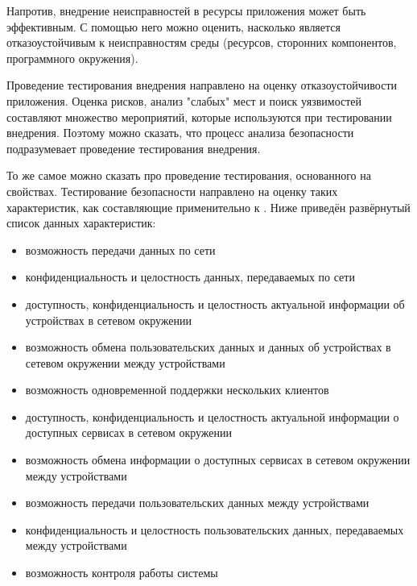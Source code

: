 %
Напротив, внедрение неисправностей в ресурсы приложения может быть эффективным. 
%
С помощью него можно оценить, насколько \PeerHood является отказоустойчивым к неисправностям среды (ресурсов, сторонних компонентов, программного окружения). 

%
Проведение тестирования внедрения направлено на оценку отказоустойчивости приложения. 
%
Оценка рисков, анализ "слабых" мест и поиск уязвимостей составляют множество мероприятий, которые используются при тестировании внедрения. 
%
Поэтому можно сказать, что процесс анализа безопасности \PeerHood подразумевает проведение тестирования внедрения. 

%
То же самое можно сказать про проведение тестирования, основанного на свойствах. 
%
Тестирование безопасности \PeerHood направлено на оценку таких характеристик, как составляющие \CIATriad применительно к \PeerHood. Ниже приведён развёрнутый список данных характеристик:
\begin{itemize}
	\setlength{\itemsep}{0pt}%

	\item возможность передачи данных по сети
	\item конфиденциальность и целостность данных, передаваемых по сети

	\item доступность, конфиденциальность и целостность актуальной информации об устройствах в сетевом окружении
	\item возможность обмена пользовательских данных и данных об устройствах в сетевом окружении между устройствами
	\item возможность одновременной поддержки нескольких клиентов

	\item доступность, конфиденциальность и целостность актуальной информации о доступных сервисах в сетевом окружении
	\item возможность обмена информации о доступных сервисах в сетевом окружении между устройствами

	\item возможность передачи пользовательских данных между устройствами
	\item конфиденциальность и целостность пользовательских данных, передаваемых между устройствами
	\item возможность контроля работы системы
\end{itemize}

